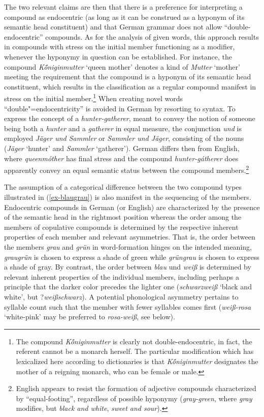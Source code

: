 \documentclass[output=paper
 ,nobabel
 ,draftmode
 ,colorlinks, citecolor=brown
]{langscibook}
\begin{document}
The two relevant claims are then that there is a preference for interpreting a compound as endocentric (as long as it can be construed as a hyponym of its semantic head constituent) and that German grammar does not allow ``double-endocentric'' compounds.
As for the analysis of given words, this approach results in compounds with stress on the initial member functioning as a modifier, whenever the hyponymy in question can be established. For instance, the compound \emph{Kö́niginmutter} `queen mother' denotes a kind of \emph{Mutter} `mother' meeting the requirement that the compound is a hyponym of its semantic head constituent, which results in the classification as a regular compound manifest in stress on the initial member.\footnote{The compound \emph{Kö́niginmutter} is clearly not double-endocentric, in fact, the referent cannot be a monarch herself. The particular modification which has lexicalized here according to dictionaries is that \emph{Kö́niginmutter} designates the mother of a reigning monarch, who can be female or male.} When creating novel words ``double"=endocentricity'' is avoided in German by resorting to syntax. To express the concept of a \emph{hunter-gatherer}, meant to convey the notion of someone being both a \emph{hunter} and a \emph{gatherer} in equal measure, the conjunction \emph{und} is employed \emph{Jäger und Sammler} or \emph{Sammler und Jäger}, consisting of the nouns (\emph{Jäger} `hunter' and \emph{Sammler} `gatherer'). German differs then from English, where \emph{queenmóther} has final stress and the compound \emph{hunter-gátherer} does apparently convey an equal semantic status between the compound members.\footnote{English appears to resist the formation of adjective compounds characterized by ``equal-footing'', regardless of possible hyponymy (\eg \emph{gray-green}, where \emph{gray} modifies, but \emph{black and white}, \emph{sweet and sour}).}

The assumption of a categorical difference between the two compound types illustrated in
(\ref{ex-blaugrau}) is also manifest in the sequencing of the members. Endocentric compounds in
German (or English) are characterized by the presence of the semantic head in the rightmost position
whereas the order among the members of copulative compounds is determined by the respective inherent
properties of each member and relevant asymmetries. That is, the order between the members
\emph{grau} and \emph{grün} in word-formation hinges on the intended meaning, \emph{graugrün} is
chosen to express a shade of green while \emph{grüngrau} is chosen to express a shade of gray. By
contrast, the order between \emph{blau} und \emph{weiß} is determined by relevant inherent
properties of the individual members, including perhaps a principle that the darker color precedes
the lighter one (\emph{schwarzweiß} `black and white', but ?\emph{weißschwarz}). A potential
phonological asymmetry pertains to syllable count such that the member with fewer syllables comes
first (\eg \emph{weiß-rosa} `white-pink' may be preferred to \emph{rosa-weiß}, see below).
\end{document}
